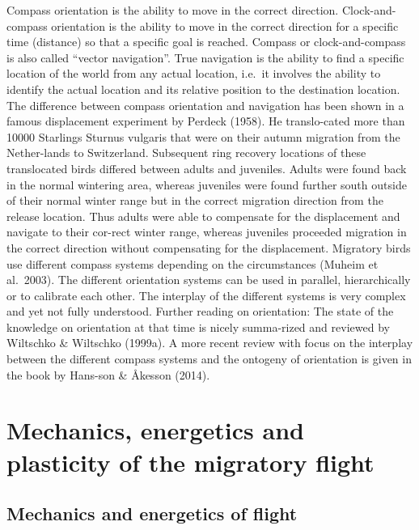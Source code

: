 \documentclass[
]{book}
\begin{document}
Compass orientation is the ability to move in the correct direction. Clock-and-compass orientation is the ability to move in the correct direction for a specific time (distance) so that a specific goal is reached. Compass or clock-and-compass is also called ``vector navigation''. True navigation is the ability to find a specific location of the world from any actual location, i.e.~it involves the ability to identify the actual location and its relative position to the destination location. The difference between compass orientation and navigation has been shown in a famous displacement experiment by Perdeck (1958). He translo-cated more than 10000 Starlings Sturnus vulgaris that were on their autumn migration from the Nether-lands to Switzerland. Subsequent ring recovery locations of these translocated birds differed between adults and juveniles. Adults were found back in the normal wintering area, whereas juveniles were found further south outside of their normal winter range but in the correct migration direction from the release location. Thus adults were able to compensate for the displacement and navigate to their cor-rect winter range, whereas juveniles proceeded migration in the correct direction without compensating for the displacement.
Migratory birds use different compass systems depending on the circumstances (Muheim et al.~2003). The different orientation systems can be used in parallel, hierarchically or to calibrate each other. The interplay of the different systems is very complex and yet not fully understood.
Further reading on orientation: The state of the knowledge on orientation at that time is nicely summa-rized and reviewed by Wiltschko \& Wiltschko (1999a). A more recent review with focus on the interplay between the different compass systems and the ontogeny of orientation is given in the book by Hans-son \& Åkesson (2014).
 

\hypertarget{mechanics-energetics-and-plasticity-of-the-migratory-flight}{%
\chapter{Mechanics, energetics and plasticity of the migratory flight}\label{mechanics-energetics-and-plasticity-of-the-migratory-flight}}

\hypertarget{mechanics-and-energetics-of-flight}{%
\section{Mechanics and energetics of flight}\label{mechanics-and-energetics-of-flight}}
\end{document}
